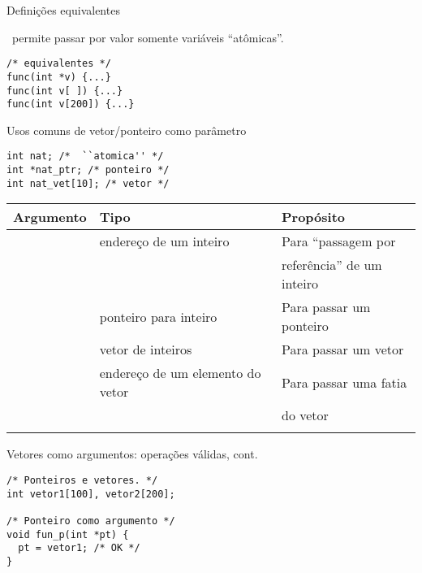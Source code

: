 \begin{frame}[fragile]{Definições equivalentes}

\CEE\ permite passar por valor somente variáveis ``atômicas''.

\begin{lstlisting}
/* equivalentes */
func(int *v) {...} 
func(int v[ ]) {...}
func(int v[200]) {...}
\end{lstlisting}

\bigskip
\pause


\end{frame}

\begin{frame}[fragile]{Usos comuns de \alert{vetor/ponteiro} como parâmetro}

\begin{lstlisting}
int nat; /*  ``atomica'' */
int *nat_ptr; /* ponteiro */
int nat_vet[10]; /* vetor */
\end{lstlisting}

\bigskip
\scriptsize\noindent
\begin{tabular}[h]{lll}\hline
\bf \scriptsize Argumento  & \bf Tipo & \bf Propósito \\\hline
\color{blue}{\tt func(\&nat);} & \color{blue}endereço de um inteiro & \color{blue}Para ``passagem por
 \\
& &\color{blue} referência'' de um inteiro \\
\color{green!30!black}{\tt func(nat\_ptr);} & \color{green!30!black}ponteiro para inteiro & \color{green!30!black}Para passar um ponteiro \\
\color{blue}{\tt func(nat\_vet);} & \color{blue}vetor de inteiros & \color{blue}Para passar um vetor \\
\color{green!30!black}{\tt func(\&nat\_vet[i]);} & \color{green!30!black}endereço de um elemento do vetor & \color{green!30!black}Para passar
uma fatia \\
&& \color{green!30!black}do vetor \\
\\\hline 
\end{tabular}

\end{frame}

\begin{frame}[fragile]{Vetores como argumentos: operações válidas, cont.}
\begin{lstlisting}
/* Ponteiros e vetores. */
int vetor1[100], vetor2[200];

/* Ponteiro como argumento */
void fun_p(int *pt) {
  pt = vetor1; /* OK */
}
\end{lstlisting}
\end{frame}

